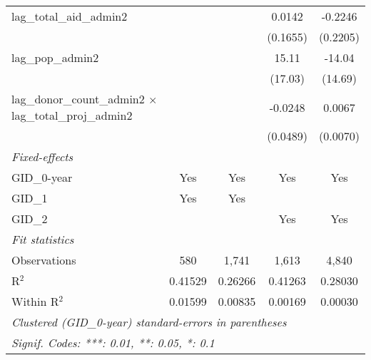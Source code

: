 \begin{tabular}{lcccc}
   lag\_total\_aid\_admin2                                            &              &              & 0.0142   & -0.2246\\   
                                                                      &              &              & (0.1655) & (0.2205)\\   
   lag\_pop\_admin2                                                   &              &              & 15.11    & -14.04\\   
                                                                      &              &              & (17.03)  & (14.69)\\   
   lag\_donor\_count\_admin2 $\times$ lag\_total\_proj\_admin2        &              &              & -0.0248  & 0.0067\\   
                                                                      &              &              & (0.0489) & (0.0070)\\   
   \midrule
   \emph{Fixed-effects}\\
   GID\_0-year                                                        & Yes          & Yes          & Yes      & Yes\\  
   GID\_1                                                             & Yes          & Yes          &          & \\  
   GID\_2                                                             &              &              & Yes      & Yes\\  
   \midrule
   \emph{Fit statistics}\\
   Observations                                                       & 580          & 1,741        & 1,613    & 4,840\\  
   R$^2$                                                              & 0.41529      & 0.26266      & 0.41263  & 0.28030\\  
   Within R$^2$                                                       & 0.01599      & 0.00835      & 0.00169  & 0.00030\\  
   \midrule \midrule
   \multicolumn{5}{l}{\emph{Clustered (GID\_0-year) standard-errors in parentheses}}\\
   \multicolumn{5}{l}{\emph{Signif. Codes: ***: 0.01, **: 0.05, *: 0.1}}\\
\end{tabular}
\par\endgroup


